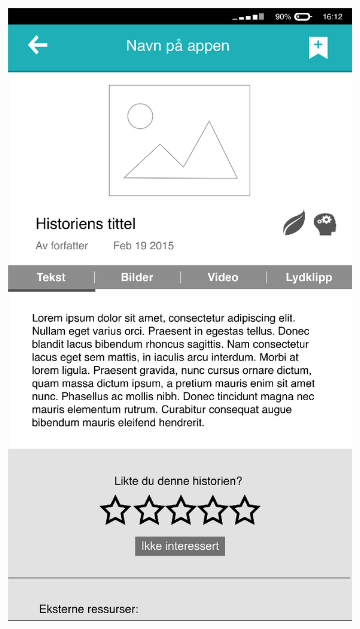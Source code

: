 \begin{figure}
	\centering
	\begin{subfigure}[h]{0.3\textwidth}
		\includegraphics[width=\textwidth]{fig/prototype1}
	\end{subfigure}
	\begin{subfigure}[h]{0.3\textwidth}

\end{subfigure}
\end{figure}
